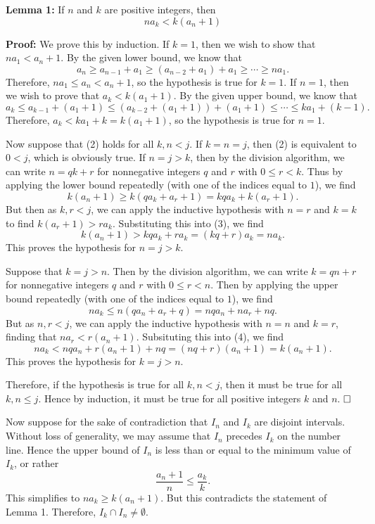 \begin{enumerate}
 \textbf{Lemma 1:} If $n$ and $k$ are positive integers, then
 \[na_k< k(a_n+1)\tag{2}\]

 \textbf{Proof:} We prove this by induction. If $k=1$, then we wish to show that $na_1< a_n+1$. By the given lower bound, we know that
 \[a_n\ge a_{n-1}+a_1\ge (a_{n-2}+a_1)+a_1\ge \cdots \ge na_1.\]Therefore, $na_1\le a_n<a_n+1$, so the hypothesis is true for $k=1$. If $n=1$, then we wish to prove that $a_k < k(a_1+1)$. By the given upper bound, we know that
 \[a_k\le a_{k-1}+(a_1+1)\le (a_{k-2}+(a_1+1))+(a_1+1)\le\cdots\le ka_1+(k-1).\]Therefore, $a_k<ka_1+k=k(a_1+1)$, so the hypothesis is true for $n=1$.

 Now suppose that (2) holds for all $k,n<j$. If $k=n=j$, then (2) is equivalent to $0<j$, which is obviously true. If $n=j>k$, then by the division algorithm, we can write $n=qk+r$ for nonnegative integers $q$ and $r$ with $0\le r<k$. Thus by applying the lower bound repeatedly (with one of the indices equal to $1$), we find
 \[k(a_n+1)\ge k(qa_k+a_r+1)=kqa_k+k(a_r+1).\tag{3}\]But then as $k,r<j$, we can apply the inductive hypothesis with $n=r$ and $k=k$ to find $k(a_r+1)> ra_k$. Substituting this into (3), we find
 \[k(a_n+1)> kqa_k+ra_k=(kq+r)a_k=na_k.\]This proves the hypothesis for $n=j>k$.

 Suppose that $k=j>n$. Then by the division algorithm, we can write $k=qn+r$ for nonnegative integers $q$ and $r$ with $0\le r<n$. Then by applying the upper bound repeatedly (with one of the indices equal to $1$), we find
 \[na_k\le n(qa_n+a_r+q)=nqa_n+na_r+nq.\tag{4}\]But as $n,r<j$, we can apply the inductive hypothesis with $n=n$ and $k=r$, finding that $na_r< r(a_n+1)$. Subsituting this into (4), we find
 \[na_k< nqa_n+r(a_n+1)+nq=(nq+r)(a_n+1)=k(a_n+1).\]This proves the hypothesis for $k=j>n$.

 Therefore, if the hypothesis is true for all $k,n<j$, then it must be true for all $k,n\le j$. Hence by induction, it must be true for all positive integers $k$ and $n$. $\hfill\ensuremath{\square}$

 Now suppose for the sake of contradiction that $I_n$ and $I_k$ are disjoint intervals. Without loss of generality, we may assume that $I_n$ precedes $I_k$ on the number line. Hence the upper bound of $I_n$ is less than or equal to the minimum value of $I_k$, or rather
 \[\frac{a_{n}+1}{n}\le \frac{a_k}{k}.\]This simplifies to $na_k\ge k(a_n+1)$. But this contradicts the statement of Lemma 1. Therefore, $I_k\cap I_n\ne \emptyset$.


\end{enumerate}
